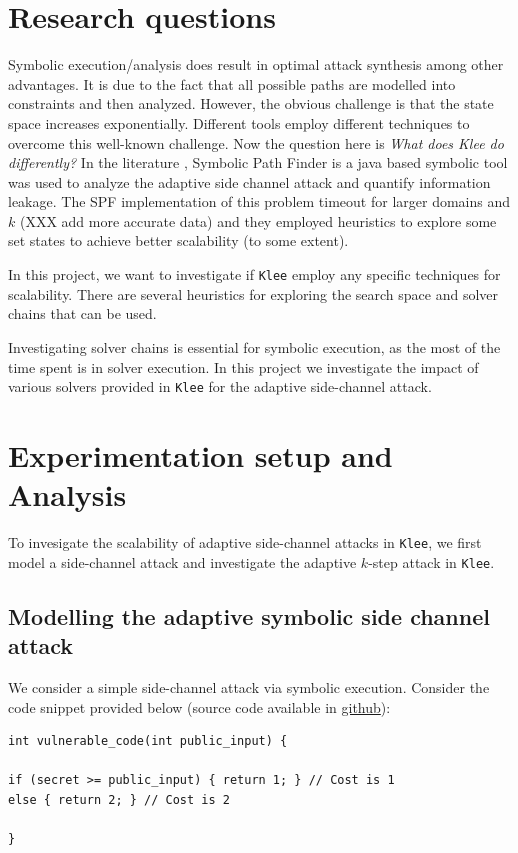 \documentclass[11pt,a4paper,notitlepage]{article}
\begin{document}
\section{Research questions}
\label{sec:researchquestions}

Symbolic execution/analysis does result in optimal attack synthesis among other advantages. It is due to the fact that all possible paths are modelled into constraints and then analyzed.
However, the obvious challenge is that the state space increases exponentially.
Different tools employ different techniques to overcome this well-known challenge. Now the question here is \emph{What does Klee do differently?}
In the literature \cite{phan2017synthesis}, Symbolic Path Finder is a java based symbolic tool was used to analyze the adaptive side channel attack and quantify information leakage.
The SPF implementation of this problem timeout for larger domains and $k$ (XXX add more accurate data) and they employed heuristics to explore some set states to achieve better scalability (to some extent).

In this project, we want to investigate if \texttt{Klee} employ any specific techniques for scalability.
There are several heuristics for exploring the search space and solver chains that can be used.

Investigating solver chains is essential for symbolic execution, as the most of the time spent is in solver execution.
In this project we investigate the impact of various solvers provided in \texttt{Klee} for the adaptive side-channel attack. 

\section{Experimentation setup and Analysis}
\label{sec:experimentationanddesign}

To invesigate the scalability of adaptive side-channel attacks in \texttt{Klee}, we first model a side-channel attack and investigate the adaptive $k$-step attack in \texttt{Klee}.

\subsection{Modelling the adaptive symbolic side channel attack}
\label{subsec:modellingsscattack}

We consider a simple side-channel attack via symbolic execution.
Consider the code snippet provided below (source code available in \href{https://github.com/irfansha/LBS_projects.git}{github}):
\begin{verbatim}
int vulnerable_code(int public_input) {

if (secret >= public_input) { return 1; } // Cost is 1
else { return 2; } // Cost is 2

}
\end{verbatim}
\end{document}
